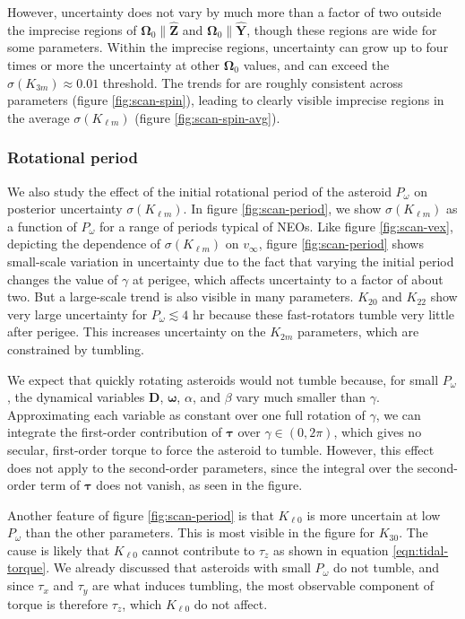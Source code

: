 \documentclass[fleqn,usenatbib]{mnras}
\newcommand{\unit}[1]{\bm{\hat{#1}}}
\begin{document}
However, uncertainty does not vary by much more than a factor of two outside the imprecise regions of $\bm \Omega_0 \parallel \unit Z$ and $\bm \Omega_0 \parallel \unit Y$, though these regions are wide for some parameters. Within the imprecise regions, uncertainty can grow up to four times or more the uncertainty at other $\bm \Omega_0$ values, and can exceed the $\sigma(K_{3 m}) \approx 0.01$ threshold. The trends for are roughly consistent across parameters (figure \ref{fig:scan-spin}), leading to clearly visible imprecise regions in the average $\sigma(K_{\ell m})$ (figure \ref{fig:scan-spin-avg}).




\subsubsection{Rotational period}
\label{sec:scan-period}

We also study the effect of the initial rotational period of the asteroid $P_\omega$ on posterior uncertainty $\sigma(K_{\ell m})$. In figure \ref{fig:scan-period}, we show $\sigma(K_{\ell m})$ as a function of $P_\omega$ for a range of periods typical of NEOs. Like figure \ref{fig:scan-vex}, depicting the dependence of $\sigma(K_{\ell m})$ on $v_\infty$, figure \ref{fig:scan-period} shows small-scale variation in uncertainty due to the fact that varying the initial period changes the value of $\gamma$ at perigee, which affects uncertainty to a factor of about two. But a large-scale trend is also visible in many parameters. $K_{20}$ and $K_{22}$ show very large uncertainty for $P_\omega \lesssim 4$ hr because these fast-rotators tumble very little after perigee. This increases uncertainty on the $K_{2m}$ parameters, which are constrained by tumbling.

We expect that quickly rotating asteroids would not tumble because, for small $P_\omega$, the dynamical variables $\bm D$, $\bm \omega$, $\alpha$, and $\beta$ vary much smaller than $\gamma$. Approximating each variable as constant over one full rotation of $\gamma$, we can integrate the first-order contribution of $\bm \tau$ over $\gamma \in (0, 2\pi)$, which gives no secular, first-order torque to force the asteroid to tumble. However, this effect does not apply to the second-order parameters, since the integral over the second-order term of $\bm \tau$ does not vanish, as seen in the figure.

Another feature of figure \ref{fig:scan-period} is that $K_{\ell 0}$ is more uncertain at low $P_\omega$ than the other parameters. This is most visible in the figure for $K_{30}$. The cause is likely that $K_{\ell 0}$ cannot contribute to $\tau_z$ as shown in equation \ref{eqn:tidal-torque}. We already discussed that asteroids with small $P_\omega$ do not tumble, and since $\tau_x$ and $\tau_y$ are what induces tumbling, the most observable component of torque is therefore $\tau_z$, which $K_{\ell 0}$ do not affect.
\end{document}
